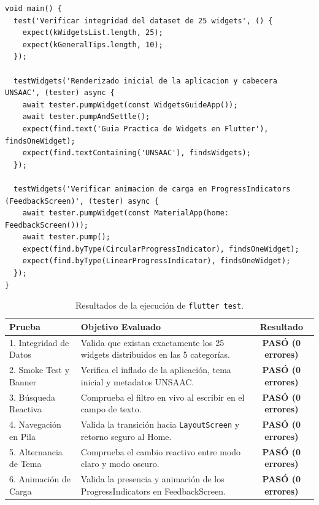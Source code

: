 \documentclass[12pt,a4paper]{article}
\begin{document}
\begin{lstlisting}[caption={Suite de pruebas implementada para la aplicación},label={lst:tests}]
void main() {
  test('Verificar integridad del dataset de 25 widgets', () {
    expect(kWidgetsList.length, 25);
    expect(kGeneralTips.length, 10);
  });

  testWidgets('Renderizado inicial de la aplicacion y cabecera UNSAAC', (tester) async {
    await tester.pumpWidget(const WidgetsGuideApp());
    await tester.pumpAndSettle();
    expect(find.text('Guia Practica de Widgets en Flutter'), findsOneWidget);
    expect(find.textContaining('UNSAAC'), findsWidgets);
  });

  testWidgets('Verificar animacion de carga en ProgressIndicators (FeedbackScreen)', (tester) async {
    await tester.pumpWidget(const MaterialApp(home: FeedbackScreen()));
    await tester.pump();
    expect(find.byType(CircularProgressIndicator), findsOneWidget);
    expect(find.byType(LinearProgressIndicator), findsOneWidget);
  });
}
\end{lstlisting}

\begin{table}[h!]
\centering
\begin{tabularx}{\textwidth}{|l|>{\raggedright\arraybackslash}X|c|}
\hline
\textbf{Prueba} & \textbf{Objetivo Evaluado} & \textbf{Resultado} \\
\hline
1. Integridad de Datos & Valida que existan exactamente los 25 widgets distribuidos en las 5 categorías. & \textbf{PASÓ (0 errores)} \\
\hline
2. Smoke Test y Banner & Verifica el inflado de la aplicación, tema inicial y metadatos UNSAAC. & \textbf{PASÓ (0 errores)} \\
\hline
3. Búsqueda Reactiva & Comprueba el filtro en vivo al escribir en el campo de texto. & \textbf{PASÓ (0 errores)} \\
\hline
4. Navegación en Pila & Valida la transición hacia \texttt{LayoutScreen} y retorno seguro al Home. & \textbf{PASÓ (0 errores)} \\
\hline
5. Alternancia de Tema & Comprueba el cambio reactivo entre modo claro y modo oscuro. & \textbf{PASÓ (0 errores)} \\
\hline
6. Animación de Carga & Valida la presencia y animación de los ProgressIndicators en FeedbackScreen. & \textbf{PASÓ (0 errores)} \\
\hline
\end{tabularx}
\caption{Resultados de la ejecución de \texttt{flutter test}.}
\label{tab:test_results}
\end{table}
\end{document}
